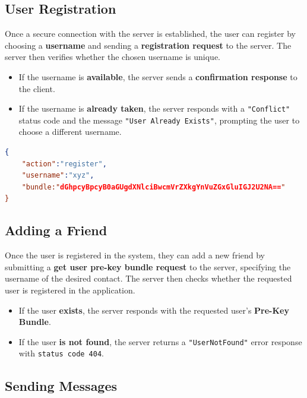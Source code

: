 \subsection{User Registration}
\label{subsec:UserRegistration}

Once a secure connection with the server is established, the user can register by choosing a \textbf{username} and sending a \textbf{registration request} to the server. The server then verifies whether the chosen username is unique.

\begin{itemize}
    \item If the username is \textbf{available}, the server sends a \textbf{confirmation response} to the client.
    \item If the username is \textbf{already taken}, the server responds with a \texttt{"Conflict"} status code and the message \texttt{"User Already Exists"}, prompting the user to choose a different username.
\end{itemize}

\begin{lstlisting}[language=json, caption= Example of a Registration request]
{
    "action":"register",
    "username":"xyz",
    "bundle:"dGhpcyBpcyB0aGUgdXNlciBwcmVrZXkgYnVuZGxGluIGJ2U2NA=="
}
\end{lstlisting}

\subsection{Adding a Friend}
\label{subsec:AddingAFriend}

Once the user is registered in the system, they can add a new friend by submitting a \textbf{get user pre-key bundle request} to the server, specifying the username of the desired contact. The server then checks whether the requested user is registered in the application.

\begin{itemize}
    \item If the user \textbf{exists}, the server responds with the requested user's \textbf{Pre-Key Bundle}.
    \item If the user \textbf{is not found}, the server returns a \texttt{"UserNotFound"} error response with \texttt{status code 404}.
\end{itemize}

\subsection{Sending Messages}
\label{subsec:SendingMessages}

